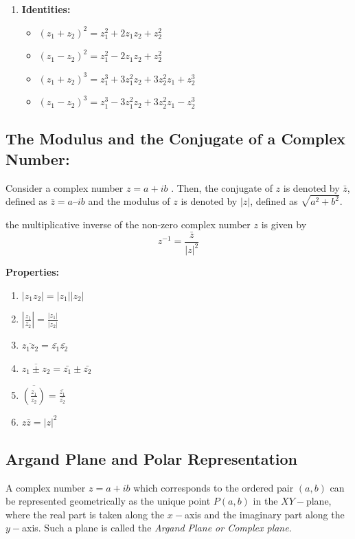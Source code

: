 \documentclass{article}
\begin{document}
\begin{multicols}{2}
\begin{enumerate}
\item \textbf{Identities:}
\begin{itemize}
    \item $(z_1+z_2)^2=z_1^2+2z_1z_2+z_2^2$
    \item $(z_1-z_2)^2=z_1^2-2z_1z_2+z_2^2$
    \item $(z_1+z_2)^3=z_1^3+3z_1^2z_2+3z_2^2z_1+z_2^3$
    \item $(z_1-z_2)^3=z_1^3-3z_1^2z_2+3z_2^2z_1-z_2^3$
\end{itemize}

\end{enumerate}

\subsection*{The Modulus and the Conjugate of a Complex Number:}

Consider a complex number $z = a + ib$ . Then, the conjugate of $z$ is denoted by $\bar{z}$, defined as $\bar{z} = a – ib$ and the modulus of $z$ is denoted by $|z|$, defined as $\sqrt{a^2+b^2}$.

the multiplicative inverse of the non-zero complex number $z$ is
given by
$$z^{-1}=\frac{\bar{z}}{|z|^2}$$

\textbf{Properties:}
\begin{enumerate}
    \item $ |z_1 z_2| = |z_1| |z_2|$
    \item $|\frac{z_1}{z_2}|=\frac{|z_1|}{|z_2|}$
    \item $\overline{z_1z_2}=\bar{z_1}\bar{z_2}$
    \item $\overline{z_1 \pm z_2}=\bar{z_1} \pm \bar{z_2} $
    \item $\overline{(\frac{z_1}{z_2})}=\frac{\bar{z_1}}{\bar{z_2}}$
    \item $z \bar{z} ={|z|}^2$
\end{enumerate}

\subsection*{Argand Plane and Polar Representation}
A complex number $z = a + ib$ which corresponds to the ordered pair $(a, b)$ can be represented geometrically as the unique point $P(a, b)$ in the $XY-$plane, where the real part is taken along the $x-$axis and the imaginary part along the $y-$axis. Such a plane is called the \emph{Argand Plane or Complex plane}.


\end{multicols}
\end{document}
